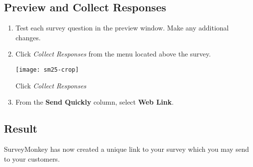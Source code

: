 \documentclass{tufte-handout}
\begin{document}
\subsection{Preview and Collect Responses}

\begin{enumerate}
    \item Test each survey question in the preview window. Make any additional changes. 
    \item Click \textit{Collect Responses} from the menu located above the survey.

        \begin{marginfigure}[1\baselineskip]%
            \texttt{[image: sm25-crop]}
            \caption{Click \textit{Collect Responses}}
            \label{fig:marginfig7}
        \end{marginfigure}

    \item From the \textbf{Send Quickly} column, select \textbf{Web Link}.



\end{enumerate}
\subsection{Result}



SurveyMonkey has now created a unique link to your survey which you may send to your customers.



\end{document}
